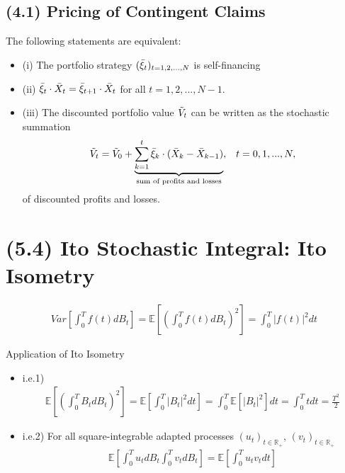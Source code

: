 \documentclass[12pt]{extarticle}
\newcommand{\<}{\langle}
\renewcommand{\>}{\rangle}
\theoremstyle{definition}
\begin{document}
\subsection{(4.1) Pricing of Contingent Claims}
\begin{tcolorbox}[enhanced, drop fuzzy shadow, title=Lemma 4.2]
The following statements are equivalent:
\begin{itemize}
    \item (i) The portfolio strategy $(\Bar{\xi}_t)_{t=1,2,...,N}$ is self-financing \\
    \item (ii) $\Bar{\xi}_t \cdot \Bar{X}_t = \Bar{\xi}_{t+1} \cdot \Bar{X}_t$ for all $t=1,2,...,N-1$. \\
    \item (iii) The discounted portfolio value $\Tilde{V}_t$ can be written as the stochastic summation
    \begin{align*}
        \Tilde{V}_t = \Tilde{V}_0 + \underbrace{\sum^t_{k=1}\Bar{\xi}_k \cdot (\Bar{X}_k - \Bar{X}_{k-1})}_\text{sum of profits and losses}, && t=0,1,...,N,
    \end{align*}
    of discounted profits and losses.
\end{itemize}
\end{tcolorbox}


\newpage
\section{(5.4) Ito Stochastic Integral: Ito Isometry}
\begin{tcolorbox}[enhanced, drop fuzzy shadow, title=Proposition 5.9; Ito Isometry]
\begin{align*}
    Var\left[\int^T_0 f(t)dB_t \right] = \mathbb{E}\left[\left(\int^T_0 f(t)dB_t \right)^2 \right] = \int^T_0 \big|f(t)\big|^2 dt
\end{align*}
\end{tcolorbox}

Application of Ito Isometry \\
\begin{itemize}
    \item i.e.1)\\
    \begin{align*}
    \mathbb{E}\left[\left(\int^T_0 B_t dB_t \right)^2 \right] = \mathbb{E}\left[\int^T_0 \big|B_t\big|^2 dt \right] = \int^T_0 \mathbb{E}\left[ \big|B_t\big|^2 \right]dt = \int^T_0 tdt = \frac{T^2}{2}
    \end{align*}
    \item i.e.2) For all square-integrable adapted processes $(u_t)_{t \in \mathbb{R}_+}$, $(v_t)_{t \in \mathbb{R}_+}$\\
    \begin{align*}
    \mathbb{E}\left[\int^T_0 u_t dB_t \int^T_0 v_t dB_t \right] = \mathbb{E}\left[ \int^T_0 u_t v_t dt \right]
    \end{align*}
\end{itemize}
\end{document}
